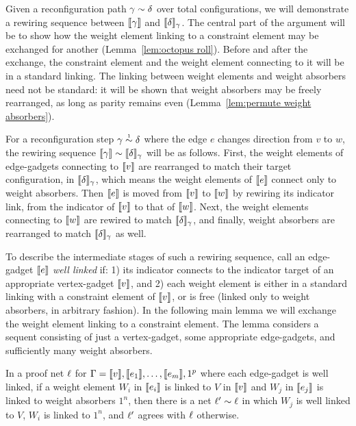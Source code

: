 \documentclass{lmcs}
\begin{document}
Given a reconfiguration path $\gamma\perm\delta$ over total configurations, we will demonstrate a rewiring sequence between $\llbracket\gamma\rrbracket$ and $\llbracket\delta\rrbracket_\gamma$.
%
The central part of the argument will be to show how the weight element linking to a constraint element may be exchanged for another (Lemma~\ref{lem:octopus roll}).
%
Before and after the exchange, the constraint element and the weight element connecting to it will be in a standard linking.
%
The linking between weight elements and weight absorbers need not be standard: it will be shown that weight absorbers may be freely rearranged, as long as parity remains even (Lemma~\ref{lem:permute weight absorbers}).



For a reconfiguration step $\gamma\perm*\delta$ where the edge $e$ changes direction from $v$ to $w$, the rewiring sequence $\itn\gamma\perm\itn\delta_\gamma$ will be as follows.
%
First, the weight elements of edge-gadgets connecting to $\llbracket v\rrbracket$ are rearranged to match their target configuration, in $\llbracket\delta\rrbracket_\gamma$, which means the weight elements of $\llbracket e\rrbracket$ connect only to weight absorbers.
%
Then $\llbracket e\rrbracket$ is moved from $\llbracket v\rrbracket$ to $\llbracket w\rrbracket$ by rewiring its indicator link, from the indicator of $\llbracket v\rrbracket$ to that of $\llbracket w\rrbracket$.
%
Next, the weight elements connecting to $\llbracket w\rrbracket$ are rewired to match $\llbracket\delta\rrbracket_\gamma$, and finally, weight absorbers are rearranged to match $\llbracket\delta\rrbracket_\gamma$ as well.



To describe the intermediate stages of such a rewiring sequence, call an edge-gadget $\llbracket e\rrbracket$ \emph{well linked} if: 1) its indicator connects to the indicator target of an appropriate vertex-gadget $\llbracket v\rrbracket$, and 2) each weight element is either in a standard linking with a constraint element of $\llbracket v\rrbracket$, or is free (linked only to weight absorbers, in arbitrary fashion). In the following main lemma we will exchange the weight element linking to a constraint element. The lemma considers a sequent consisting of just a vertex-gadget, some appropriate edge-gadgets, and sufficiently many weight absorbers.


\begin{lemma}
\label{lem:octopus roll}
In a proof net $\ell$ for $\Gamma=\llbracket v\rrbracket,\llbracket e_1\rrbracket,\dotsc,\llbracket e_m\rrbracket,1^p$ where each edge-gadget is well linked, if a weight element $W_i$ in $\llbracket e_i\rrbracket$ is linked to $V$ in $\llbracket v\rrbracket$ and $W_j$ in $\llbracket e_j\rrbracket$ is linked to weight absorbers $1^n$, then there is a net $\links'\perm\links$ in which $W_j$ is well linked to $V$, $W_i$ is linked to $1^n$, and $\ell'$ agrees with $\ell$ otherwise.
\end{lemma}
\end{document}
